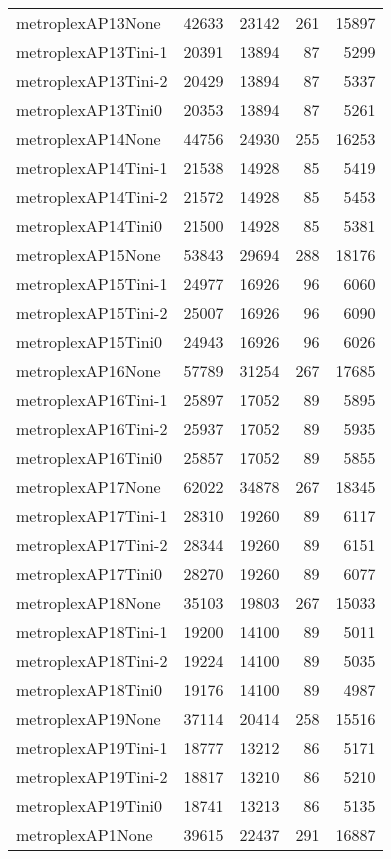 \begin{longtable}{lrrrr}
metroplexAP13None & 42633 & 23142 & 261 & 15897 \\
metroplexAP13Tini-1 & 20391 & 13894 & 87 & 5299 \\
metroplexAP13Tini-2 & 20429 & 13894 & 87 & 5337 \\
metroplexAP13Tini0 & 20353 & 13894 & 87 & 5261 \\
metroplexAP14None & 44756 & 24930 & 255 & 16253 \\
metroplexAP14Tini-1 & 21538 & 14928 & 85 & 5419 \\
metroplexAP14Tini-2 & 21572 & 14928 & 85 & 5453 \\
metroplexAP14Tini0 & 21500 & 14928 & 85 & 5381 \\
metroplexAP15None & 53843 & 29694 & 288 & 18176 \\
metroplexAP15Tini-1 & 24977 & 16926 & 96 & 6060 \\
metroplexAP15Tini-2 & 25007 & 16926 & 96 & 6090 \\
metroplexAP15Tini0 & 24943 & 16926 & 96 & 6026 \\
metroplexAP16None & 57789 & 31254 & 267 & 17685 \\
metroplexAP16Tini-1 & 25897 & 17052 & 89 & 5895 \\
metroplexAP16Tini-2 & 25937 & 17052 & 89 & 5935 \\
metroplexAP16Tini0 & 25857 & 17052 & 89 & 5855 \\
metroplexAP17None & 62022 & 34878 & 267 & 18345 \\
metroplexAP17Tini-1 & 28310 & 19260 & 89 & 6117 \\
metroplexAP17Tini-2 & 28344 & 19260 & 89 & 6151 \\
metroplexAP17Tini0 & 28270 & 19260 & 89 & 6077 \\
metroplexAP18None & 35103 & 19803 & 267 & 15033 \\
metroplexAP18Tini-1 & 19200 & 14100 & 89 & 5011 \\
metroplexAP18Tini-2 & 19224 & 14100 & 89 & 5035 \\
metroplexAP18Tini0 & 19176 & 14100 & 89 & 4987 \\
metroplexAP19None & 37114 & 20414 & 258 & 15516 \\
metroplexAP19Tini-1 & 18777 & 13212 & 86 & 5171 \\
metroplexAP19Tini-2 & 18817 & 13210 & 86 & 5210 \\
metroplexAP19Tini0 & 18741 & 13213 & 86 & 5135 \\
metroplexAP1None & 39615 & 22437 & 291 & 16887 \\

\end{longtable}
